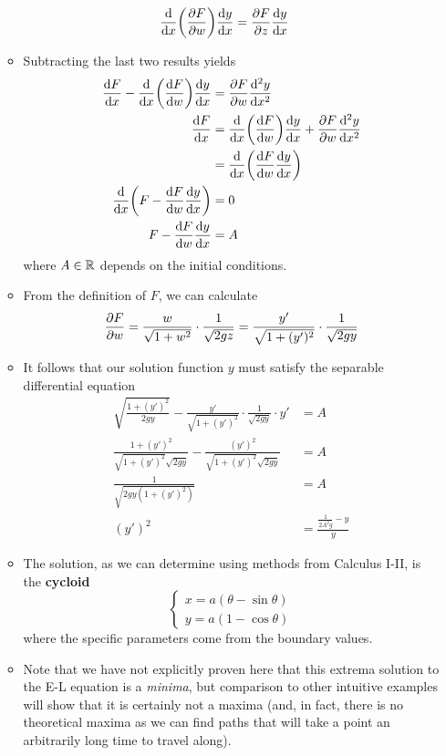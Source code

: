 \documentclass[../notes.tex]{subfiles}
\begin{document}
\begin{itemize}
\begin{itemize}
\begin{align*}
            \dv{x}(\pdv{F}{w})\dv{y}{x} &= \pdv{F}{z}\dv{y}{x}
        \end{align*}
        \item Subtracting the last two results yields
        \begin{align*}
            \dv{F}{x}-\dv{x}(\dv{F}{w})\dv{y}{x} &= \pdv{F}{w}\dv[2]{y}{x}\\
            \dv{F}{x} &= \dv{x}(\dv{F}{w})\dv{y}{x}+\pdv{F}{w}\dv[2]{y}{x}\\
            &= \dv{x}(\dv{F}{w}\dv{y}{x})\\
            \dv{x}(F-\dv{F}{w}\dv{y}{x}) &= 0\\
            F-\dv{F}{w}\dv{y}{x} &= A
        \end{align*}
        where $A\in\mathbb{R}$ depends on the initial conditions.
        \item From the definition of $F$, we can calculate
        \begin{equation*}
            \pdv{F}{w} = \frac{w}{\sqrt{1+w^2}}\cdot\frac{1}{\sqrt{2gz}}
            = \frac{y'}{\sqrt{1+(y')^2}}\cdot\frac{1}{\sqrt{2gy}}
        \end{equation*}
        \item It follows that our solution function $y$ must satisfy the separable differential equation
        \begin{align*}
            \sqrt{\frac{1+(y')^2}{2gy}}-\frac{y'}{\sqrt{1+(y')^2}}\cdot\frac{1}{\sqrt{2gy}}\cdot y' &= A\\
            \frac{1+(y')^2}{\sqrt{1+(y')^2}\sqrt{2gy}}-\frac{(y')^2}{\sqrt{1+(y')^2}\sqrt{2gy}} &= A\\
            \frac{1}{\sqrt{2gy(1+(y')^2)}} &= A\\
            (y')^2 &= \frac{\frac{1}{2A^2g}-y}{y}
        \end{align*}
        \item The solution, as we can determine using methods from Calculus I-II, is the \textbf{cycloid}
        \begin{equation*}
            \begin{cases}
                x = a(\theta-\sin\theta)\\
                y = a(1-\cos\theta)
            \end{cases}
        \end{equation*}
        where the specific parameters come from the boundary values.
        \item Note that we have not explicitly proven here that this extrema solution to the E-L equation is a \emph{minima}, but comparison to other intuitive examples will show that it is certainly not a maxima (and, in fact, there is no theoretical maxima as we can find paths that will take a point an arbitrarily long time to travel along).

\end{itemize}
\end{itemize}
\end{document}
